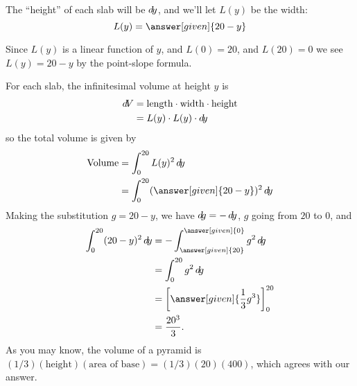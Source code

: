 \documentclass{ximera}
\begin{document}
\begin{example}
\begin{explanation}
\begin{image}
\end{image}
The ``height'' of each slab will be $\mathop{}\!d\! y$, and we'll let $L(y)$ be the width:
\[
L(y) = \answer[given]{20-y}
\]
\begin{hint}
  Since $L(y)$ is a linear function of $y$, and $L(0) = 20$, and
  $L(20) = 0$ we see $L(y) = 20-y$ by the point-slope formula.
\end{hint}
For each slab, the infinitesimal volume at height $y$ is
\begin{align*}
  \mathop{}\!d\! V &= \mathrm{length} \cdot \mathrm{width}\cdot \mathrm{height}\\
  &= L(y)\cdot L(y)\cdot  \mathop{}\!d\! y
\end{align*}
so the total volume is given by
\begin{align*}
  \mathrm{Volume} &= \int_0^{20} L(y)^2 \d y \\
  &= \int_0^{20} (\answer[given]{20-y})^2 \d y
\end{align*}
Making the substitution $g = 20-y $, we have $\mathop{}\!d\! g = - \mathop{}\!d\! y$, $g$ going from $20$ to $0$, and 
	\begin{align*}
	\int_0^{20} (20-y)^2 \d y &= -\int_{\answer[given]{20}}^{\answer[given]{0}} g^2 \d g\\
		&= \int_0^{20} g^2 \d g\\
		&= \eval{\answer[given]{\frac{1}{3} g^3}}_0^{20}\\
		&= \frac{20^3}{3}.
	\end{align*}
As you may know, the volume of a pyramid is
$(1/3)(\text{height})(\text{area of base})=(1/3)(20)(400)$, which
agrees with our answer.
\end{explanation}
\end{example}
\end{document}
